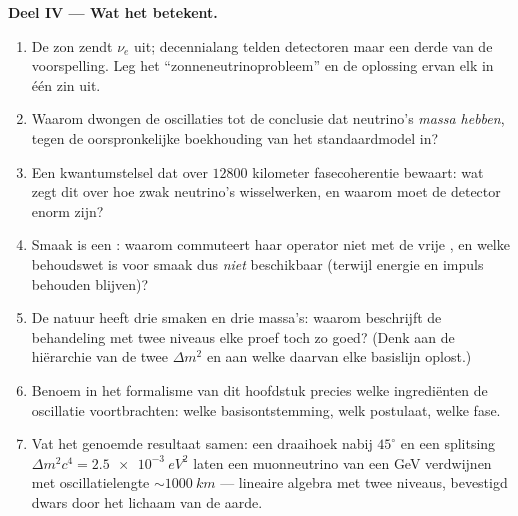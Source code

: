 \begin{problem}
\medskip\noindent\textbf{Deel IV --- Wat het betekent.}
\begin{enumerate}[resume]
  \item De zon zendt $\nu_e$ uit; decennialang telden detectoren maar een
        derde van de voorspelling. Leg het ``zonneneutrinoprobleem'' en
        de oplossing ervan elk in één zin uit.
  \item Waarom dwongen de oscillaties tot de conclusie dat neutrino's
        \emph{massa hebben}, tegen de oorspronkelijke boekhouding van het
        standaardmodel in?
  \item Een kwantumstelsel dat over $12800$ kilometer fasecoherentie
        bewaart: wat zegt dit over hoe zwak neutrino's wisselwerken, en
        waarom moet de detector enorm zijn?
  \item Smaak is een : waarom commuteert haar operator niet
        met de vrije , en welke behoudswet is voor smaak dus
        \emph{niet} beschikbaar (terwijl energie en impuls behouden
        blijven)?
  \item De natuur heeft drie smaken en drie massa's: waarom beschrijft de
        behandeling met twee niveaus elke proef toch zo goed? (Denk aan
        de hiërarchie van de twee $\Delta m^2$ en aan welke daarvan elke
        basislijn oplost.)
  \item Benoem in het formalisme van dit hoofdstuk precies welke
        ingrediënten de oscillatie voortbrachten: welke basisontstemming,
        welk postulaat, welke fase.
  \item Vat het genoemde resultaat samen: een draaihoek nabij $45^\circ$
        en een splitsing $\Delta m^2c^4 =
        \qty{2.5e-3}{eV^2}$ laten een
        muonneutrino van een GeV verdwijnen met oscillatielengte
        $\sim\qty{1000}{km}$ --- lineaire algebra met twee niveaus,
        bevestigd dwars door het lichaam van de aarde.
\end{enumerate}
\end{problem}
